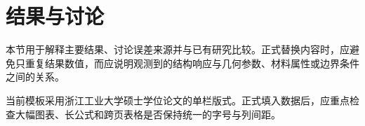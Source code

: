 \chapter{结果与讨论}

本节用于解释主要结果、讨论误差来源并与已有研究比较。正式替换内容时，应避免只重复结果数值，而应说明观测到的结构响应与几何参数、材料属性或边界条件之间的关系。

当前模板采用浙江工业大学硕士学位论文的单栏版式。正式填入数据后，应重点检查大幅图表、长公式和跨页表格是否保持统一的字号与列间距。
